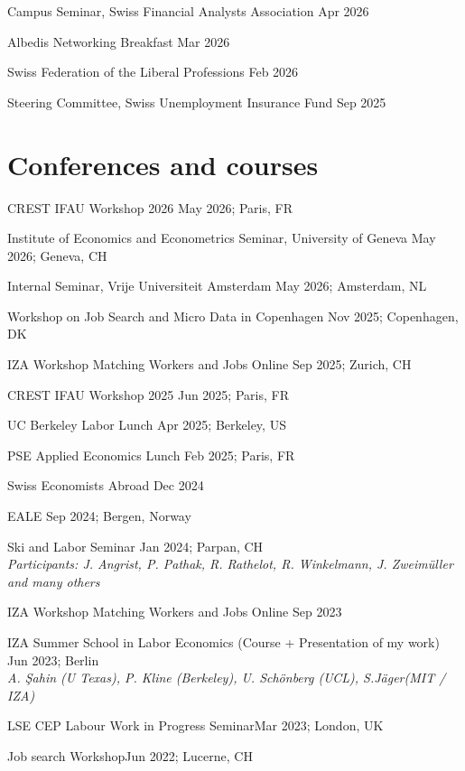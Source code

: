 \documentclass[letter, 11pt]{res}
\begin{document}
\begin{resume}
Campus Seminar, Swiss Financial Analysts Association \hfill Apr 2026

Albedis Networking Breakfast \hfill Mar 2026

Swiss Federation of the Liberal Professions \hfill Feb 2026

Steering Committee, Swiss Unemployment Insurance Fund \hfill Sep 2025

\vspace{0.5cm}
\section{Conferences and courses}
\vspace{1mm}

CREST IFAU Workshop 2026 \hfill May 2026; Paris, FR

Institute of Economics and Econometrics Seminar, University of Geneva \hfill May 2026; Geneva, CH

Internal Seminar, Vrije Universiteit Amsterdam \hfill May 2026; Amsterdam, NL

Workshop on Job Search and Micro Data in Copenhagen \hfill Nov 2025; Copenhagen, DK

IZA Workshop Matching Workers and Jobs Online \hfill Sep 2025; Zurich, CH

CREST IFAU Workshop 2025 \hfill Jun 2025; Paris, FR

UC Berkeley Labor Lunch \hfill Apr 2025; Berkeley, US

PSE Applied Economics Lunch \hfill Feb 2025; Paris, FR

Swiss Economists Abroad \hfill Dec 2024

EALE \hfill Sep 2024; Bergen, Norway

Ski and Labor Seminar \hfill Jan 2024; Parpan, CH\\
\textit{Participants: J. Angrist, P. Pathak, R. Rathelot, R. Winkelmann, J. Zweimüller and many others}

IZA Workshop Matching Workers and Jobs Online \hfill Sep 2023

IZA Summer School in Labor Economics (Course + Presentation of my work) \hfill Jun 2023; Berlin\\
\textit{A. Şahin (U Texas), P. Kline (Berkeley), U. Schönberg (UCL), S.Jäger(MIT / IZA)}

LSE CEP Labour Work in Progress Seminar\hfill Mar 2023; London, UK

Job search Workshop\hfill Jun 2022; Lucerne, CH


\end{resume}
\end{document}
